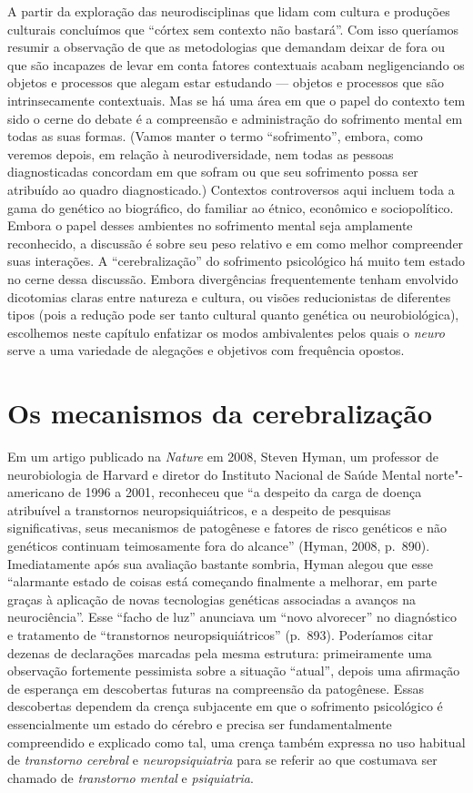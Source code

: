 A partir da exploração das neurodisciplinas que lidam com cultura e
produções culturais concluímos que ``córtex sem contexto não bastará''.
Com isso queríamos resumir a observação de que as metodologias que
demandam deixar de fora ou que são incapazes de levar em conta fatores
contextuais acabam negligenciando os objetos e processos que alegam
estar estudando --- objetos e processos que são intrinsecamente
contextuais. Mas se há uma área em que o papel do contexto tem sido o
cerne do debate é a compreensão e administração do sofrimento mental em
todas as suas formas. (Vamos manter o termo ``sofrimento'', embora, como
veremos depois, em relação à neurodiversidade, nem todas as pessoas
diagnosticadas concordam em que sofram ou que seu sofrimento possa ser
atribuído ao quadro diagnosticado.) Contextos controversos aqui incluem
toda a gama do genético ao biográfico, do familiar ao étnico, econômico
e sociopolítico. Embora o papel desses ambientes no sofrimento mental
seja amplamente reconhecido, a discussão é sobre seu peso relativo e em
como melhor compreender suas interações. A ``cerebralização'' do
sofrimento psicológico há muito tem estado no cerne dessa discussão.
Embora divergências frequentemente tenham envolvido dicotomias claras
entre natureza e cultura, ou visões reducionistas de diferentes tipos
(pois a redução pode ser tanto cultural quanto genética ou
neurobiológica), escolhemos neste capítulo enfatizar os modos
ambivalentes pelos quais o \emph{neuro} serve a uma variedade de
alegações e objetivos com frequência opostos.

\chapter{Os mecanismos da cerebralização}

Em um artigo publicado na \emph{Nature} em 2008, Steven Hyman, um
professor de neurobiologia de Harvard e diretor do Instituto Nacional de
Saúde Mental norte"-americano de 1996 a 2001, reconheceu que ``a despeito
da carga de doença atribuível a transtornos neuropsiquiátricos, e a
despeito de pesquisas significativas, seus mecanismos de patogênese e
fatores de risco genéticos e não genéticos continuam teimosamente fora
do alcance'' (Hyman, 2008, p.~890). Imediatamente após sua avaliação
bastante sombria, Hyman alegou que esse ``alarmante estado de coisas
está começando finalmente a melhorar, em parte graças à aplicação de
novas tecnologias genéticas associadas a avanços na neurociência''. Esse
``facho de luz'' anunciava um ``novo alvorecer'' no diagnóstico e
tratamento de ``transtornos neuropsiquiátricos'' (p.~893). Poderíamos
citar dezenas de declarações marcadas pela mesma estrutura:
primeiramente uma observação fortemente pessimista sobre a situação
``atual'', depois uma afirmação de esperança em descobertas futuras na
compreensão da patogênese. Essas descobertas dependem da crença
subjacente em que o sofrimento psicológico é essencialmente um estado do
cérebro e precisa ser fundamentalmente compreendido e explicado como
tal, uma crença também expressa no uso habitual de \emph{transtorno
cerebral} e \emph{neuropsiquiatria} para se referir ao que costumava ser
chamado de \emph{transtorno mental} e \emph{psiquiatria}.

